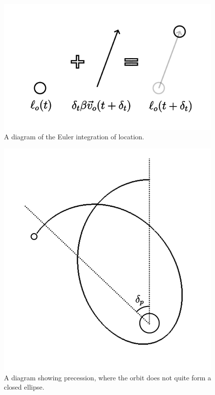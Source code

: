 \documentclass[12pt]{article}
\begin{document}
\begin{figure} 
\centering
\label{fig4}
  \includegraphics[width = 6 in]{location.png}
  \caption{
A diagram of the Euler integration of location.
}
\end{figure}



\begin{figure} 
\centering
\label{fig5}
  \includegraphics[width = 6 in]{precession.png}
  \caption{ A diagram showing precession, where the orbit does not quite form a closed ellipse.
}
\end{figure}
\end{document}
